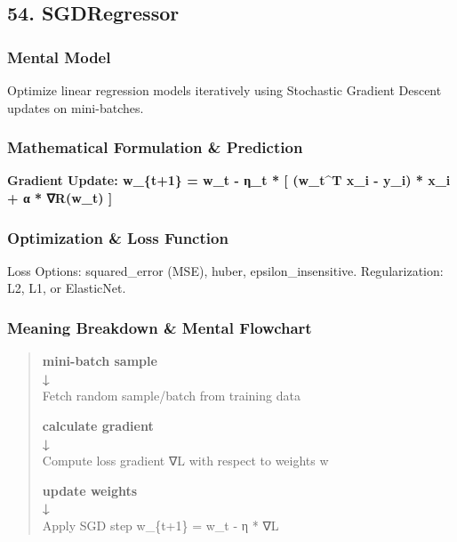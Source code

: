 \documentclass[
  10pt,
  letterpaper,
]{article}
\begin{document}
\hypertarget{sgdregressor}{%
\subsection{54. SGDRegressor}\label{sgdregressor}}

\hypertarget{mental-model-53}{%
\subsubsection{Mental Model}\label{mental-model-53}}

Optimize linear regression models iteratively using Stochastic Gradient Descent updates on mini-batches.

\hypertarget{mathematical-formulation-prediction-53}{%
\subsubsection{Mathematical Formulation \& Prediction}\label{mathematical-formulation-prediction-53}}

\textbf{Gradient Update: w\_\{t+1\} = w\_t - η\_t * {[} (w\_t\^{}T x\_i - y\_i) * x\_i + α * ∇R(w\_t) {]}}

\hypertarget{optimization-loss-function-53}{%
\subsubsection{Optimization \& Loss Function}\label{optimization-loss-function-53}}

Loss Options: \textquotesingle squared\_error\textquotesingle{} (MSE), \textquotesingle huber\textquotesingle, \textquotesingle epsilon\_insensitive\textquotesingle. Regularization: L2, L1, or ElasticNet.

\hypertarget{meaning-breakdown-mental-flowchart-53}{%
\subsubsection{Meaning Breakdown \& Mental Flowchart}\label{meaning-breakdown-mental-flowchart-53}}

\begin{quote}
\textbf{mini-batch sample\\
↓\\
}Fetch random sample/batch from training data

\textbf{calculate gradient\\
↓\\
}Compute loss gradient ∇L with respect to weights w

\textbf{update weights\\
↓\\
}Apply SGD step w\_\{t+1\} = w\_t - η * ∇L
\end{quote}
\end{document}
